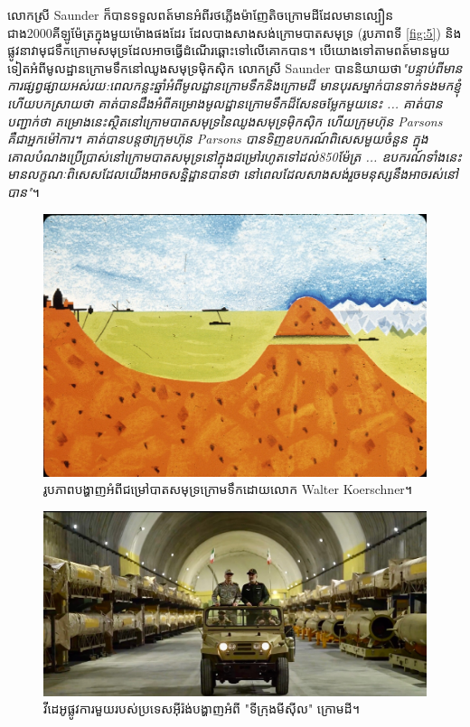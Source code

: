 \documentclass[10pt,twocolumn,letterpaper]{article}
\begin{document}
	លោកស្រី​ Saunder ក៏បានទទួលពត៍មានអំពីរថភ្លើងម៉ាញែតិចក្រោមដីដែលមានល្បឿនជាង2000គីឡូម៉ែត្រក្នុងមួយម៉ោងផងដែរ ដែលបាងសាងសង់ក្រោមបាតសមុទ្រ (រូបភាពទី \ref{fig:5}) និងផ្លូវនាវាមុជទឹកក្រោមសមុទ្រដែលអាចធ្វើដំណើរឆ្ពោះទៅលើគោកបាន។ បើយោងទៅតាមពត៍មានមួយទៀតអំពីមូលដ្ឋានក្រោមទឹកនៅឈូងសមុទ្រម៉ិកស៊ិក លោកស្រី Saunder បាននិយាយថា\textit{"បន្ទាប់ពីមានការផ្សព្វផ្សាយអស់រយ:ពេលកន្លះឆ្នាំអំពីមូលដ្ឋានក្រោមទឹកនិងក្រោមដី មានបុរសម្នាក់បានទាក់ទងមកខ្ញុំហើយបកស្រាយថា គាត់បានដឹងអំពីគម្រោងមូលដ្ឋានក្រោមទឹកដ៏សែនចម្លែកមួយនេះ ... គាត់បានបញ្ជាក់ថា គម្រោងនេះស្ថិតនៅក្រោមបាតសមុទ្រនៃឈូងសមុទ្រម៉ិកស៊ិក ហើយក្រុមហ៊ុន Parsons គឺជាអ្នកម៉ៅការ។ គាត់បានបន្តថាក្រុមហ៊ុន Parsons បានទិញឧបករណ៍ពិសេសមួយចំនួន ក្នុងគោលបំណងប្រើប្រាស់នៅក្រោមបាតសមុទ្រនៅក្នុងជម្រៅរហូតទៅដល់850ម៉ែត្រ ... ឧបករណ៍ទាំងនេះមានលក្ខណៈពិសេសដែលយើងអាចសន្និដ្ឋានបានថា នៅពេលដែលសាងសង់រួចមនុស្សនឹងអាចរស់នៅបាន"}\cite{22}។
\begin{figure}[t]
\begin{center}
   \includegraphics[width=1\linewidth]{sub.jpg}
\end{center}
   \caption{រូបភាពបង្ហាញអំពីជម្រៅបាតសមុទ្រក្រោមទឹកដោយលោក Walter Koerschner\cite{22,23}។}
\label{fig:6}
\label{fig:onecol}
\end{figure}
\begin{figure}[t]
\begin{center}
   \includegraphics[width=1\linewidth]{iran.jpeg}
\end{center}
   \caption{វីដេអូផ្លូវការមួយរបស់ប្រទេសអុីរ៉ង់បង្ហាញអំពី "ទីក្រុងមីស៊ីល" ក្រោមដី\cite{39,40}។}
\label{fig:12}
\label{fig:onecol}
\end{figure}
\end{document}
